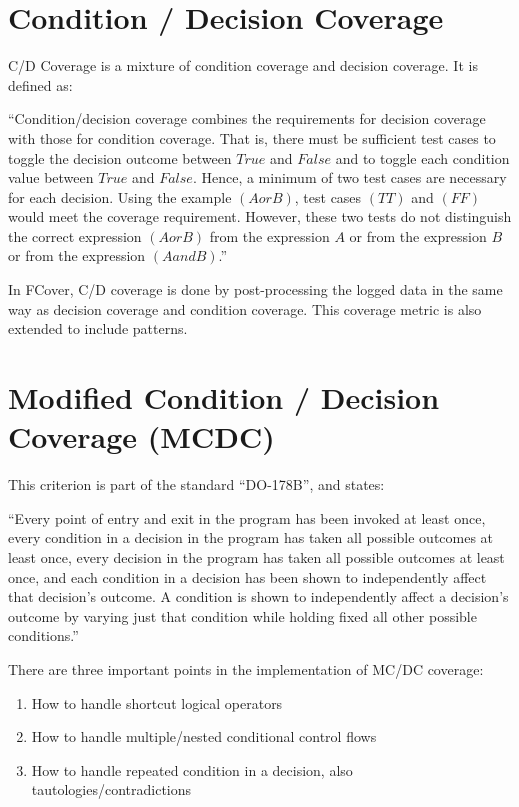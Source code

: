 \documentclass[12pt,a4paper]{report}
\begin{document}
\section{Condition / Decision Coverage}
C/D Coverage is a mixture of condition coverage and decision coverage. It is defined as:

``Condition/decision coverage combines the requirements for decision coverage with those for condition coverage. That is, there must be sufficient test cases to toggle the decision outcome between $True$ and $False$ and to toggle each condition value between $True$ and $False$. Hence, a minimum of two test cases are necessary for each decision. Using the example $(A or B)$, test cases $(TT)$ and $(FF)$ would meet the coverage requirement. However, these two tests do not distinguish the correct expression $(A or B)$ from the expression $A$ or from the expression $B$ or from the expression $(A and B)$.''\cite{KellyJ.:2001:PTM:886632} 

In FCover, C/D coverage is done by post-processing the logged data in the same way as decision coverage and condition coverage. This coverage metric is also extended to include patterns.

\section{Modified Condition / Decision Coverage (MCDC)}
This criterion is part of the standard ``DO-178B'', and states:

``Every point of entry and exit in the program has been invoked at least once, every condition in a decision in the program has taken all possible outcomes at least once, every decision in the program has taken all possible outcomes at least once, and each condition in a decision has been shown to independently affect that decision's outcome. A condition is shown to independently affect a decision's outcome by varying just that condition while holding fixed all other possible conditions.''\cite{cast-10}

There are three important points in the implementation of MC/DC coverage:

\begin{enumerate}
 \item How to handle shortcut logical operators
 \item How to handle multiple/nested conditional control flows
 \item How to handle repeated condition in a decision, also tautologies/contradictions
\end{enumerate}
 
\end{document}
